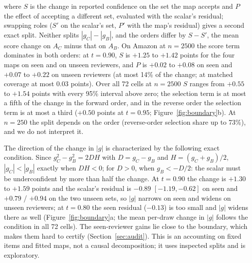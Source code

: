 \documentclass[sigconf,anonymous,review]{acmart}
\begin{document}
where $S$ is the change in reported confidence on the set the map
accepts and $P$ the effect of accepting a different set, evaluated with
the scalar's residual; swapping roles ($S'$ on the scalar's set, $P'$ with
the map's residual) gives a second exact split. Neither splits
$|g_C|-|g_B|$, and the orders differ by $S-S'$, the mean score change on
$A_C$ minus that on $A_B$. On Amazon at $n{=}2500$ the score
term dominates in both orders: at $t{=}0.90$, $S$ is $+1.25$ to $+1.42$ points
for the four maps on seen and on unseen reviewers, and $P$ is $+0.02$ to
$+0.08$ on seen and $+0.07$ to $+0.22$ on unseen reviewers (at most 14\%
of the change; at matched coverage at most $0.03$ points). Over all 72
cells at $n{=}2500$ $S$ ranges from $+0.55$ to $+1.54$ points with every
95\% interval above zero; the selection term is at most a fifth of the
change in the forward order, and in the reverse order the selection term
is at most a third ($+0.50$ points at $t{=}0.95$;
Figure~\ref{fig:boundary}b). At $n{=}250$ the split depends on the order
(reverse-order selection share up to 73\%), and we do not interpret it.

The direction of the change in $|g|$ is characterized by the following
exact condition.
Since $g_C^2-g_B^2=2DH$ with $D=g_C-g_B$ and $H=(g_C+g_B)/2$,
$|g_C|<|g_B|$ exactly when $DH<0$; for $D>0$, when $g_B<-D/2$: the
scalar must be underconfident by more than half the change. At
$t{=}0.90$ the change is $+1.30$ to $+1.59$ points and the scalar's
residual is $-0.89$ $[-1.19,-0.62]$ on seen and $+0.79$ / $+0.94$ on the
two unseen sets, so $|g|$ narrows on seen and widens on unseen reviewers;
at $t{=}0.80$ the seen residual ($-0.13$) is too small and $|g|$ widens
there as well (Figure~\ref{fig:boundary}a; the mean per-draw change in
$|g|$ follows the condition in all 72 cells). The seen-reviewer gains lie
close to the boundary, which makes them hard to certify
(Section~\ref{sec:audit}). This is an accounting on fixed items and fitted
maps, not a causal decomposition; it uses inspected splits and is
exploratory.
\end{document}
